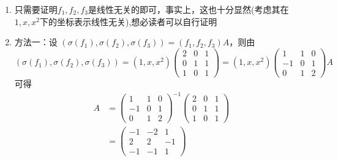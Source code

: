 \begin{exercise}
\begin{exgroup}
        \begin{answer}
            \begin{enumerate}
                \item 只需要证明$f_1,f_2,f_3$是线性无关的即可，事实上，这也十分显然(考虑其在$1,x,x^2$下的坐标表示线性无关),想必读者可以自行证明

                \item 方法一：设 $ (\sigma(f_1), \sigma(f_2), \sigma(f_3)) = (f_1, f_2, f_3) A $，则由
                      \[ (\sigma(f_1), \sigma(f_2), \sigma(f_3)) = (1, x, x^2) \begin{pmatrix}
                              2 & 0 & 1 \\
                              0 & 1 & 1 \\
                              1 & 0 & 1
                          \end{pmatrix} = (1, x, x^2) \begin{pmatrix}
                              1  & 1 & 0 \\
                              -1 & 0 & 1 \\
                              0  & 1 & 2
                          \end{pmatrix} A \]
                      可得
                      \begin{align*}
                          A & = \begin{pmatrix}
                                    1  & 1 & 0 \\
                                    -1 & 0 & 1 \\
                                    0  & 1 & 2
                                \end{pmatrix}^{-1}
                          \begin{pmatrix}
                              2 & 0 & 1 \\
                              0 & 1 & 1 \\
                              1 & 0 & 1
                          \end{pmatrix}           \\
                            & = \begin{pmatrix}
                                    -1 & -2 & 1  \\
                                    2  & 2  & -1 \\
                                    -1 & -1 & 1
                                \end{pmatrix}

\end{align*}
\end{enumerate}
\end{answer}
\end{exgroup}
\end{exercise}
